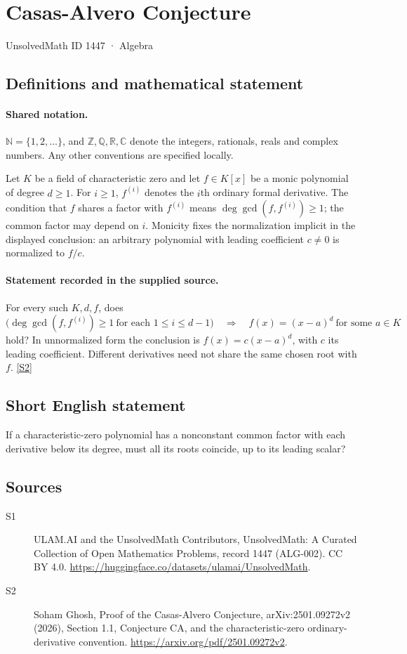 \documentclass[11pt]{article}
\newcommand{\sref}[2]{\hyperlink{source:#1:#2}{[S#2]}}
\begin{document}
\setcounter{section}{1446}
\section{Casas-Alvero Conjecture}\label{1447}
{\small\sffamily UnsolvedMath ID 1447 · Algebra}
\subsection{Definitions and mathematical statement}

\paragraph{Shared notation.}$\mathbb N=\{1,2,\ldots\}$, and $\mathbb Z,\mathbb Q,\mathbb R,\mathbb C$ denote the integers, rationals, reals and complex numbers. Any other conventions are specified locally.


Let $K$ be a field of characteristic zero and let $f\in K[x]$ be a monic polynomial of degree $d\ge1$. For $i\ge1$, $f^{(i)}$ denotes the $i$th ordinary formal derivative. The condition that $f$ shares a factor with $f^{(i)}$ means $\deg\gcd(f,f^{(i)})\ge1$; the common factor may depend on $i$. Monicity fixes the normalization implicit in the displayed conclusion: an arbitrary polynomial with leading coefficient $c\ne0$ is normalized to $f/c$.
\paragraph{Statement recorded in the supplied source.}
For every such $K,d,f$, does
\[
 \bigl(\deg\gcd(f,f^{(i)})\ge1\ \text{for each }1\le i\le d-1\bigr)
 \quad\Longrightarrow\quad
 f(x)=(x-a)^d\ \text{for some }a\in K
\]
hold? In unnormalized form the conclusion is $f(x)=c(x-a)^d$, with $c$ its leading coefficient. Different derivatives need not share the same chosen root with $f$. \sref{1447}{2}
\subsection{Short English statement}
If a characteristic-zero polynomial has a nonconstant common factor with each derivative below its degree, must all its roots coincide, up to its leading scalar?
\subsection{Sources}
\begin{description}
\item[\hypertarget{source:1447:1}{S1}] ULAM.AI and the UnsolvedMath Contributors, UnsolvedMath: A Curated Collection of Open Mathematics Problems, record 1447 (ALG-002). CC BY 4.0. \url{https://huggingface.co/datasets/ulamai/UnsolvedMath}.
\item[\hypertarget{source:1447:2}{S2}] Soham Ghosh, Proof of the Casas-Alvero Conjecture, arXiv:2501.09272v2 (2026), Section 1.1, Conjecture CA, and the characteristic-zero ordinary-derivative convention. \url{https://arxiv.org/pdf/2501.09272v2}.
\end{description}
\label{end:1447}
\end{document}
